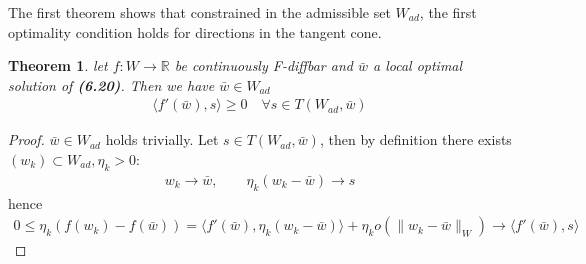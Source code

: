\documentclass[a4paper,11pt,fleqn]{book}
\newtheorem{theorem}{Theorem}[section]
\theoremstyle{definition}
\theoremstyle{remark}
\begin{document}
The first theorem shows that constrained in the admissible set $W_{ad}$, the first optimality condition holds for directions in the tangent cone.  
\begin{theorem}
	let $f: W \rightarrow \mathbb{R}$ be continuously F-diffbar and $\bar{w}$ a local optimal solution of \textbf{(6.20)}. Then we have $\bar{w} \in W_{ad}$ 
	\begin{align*}
		\langle f'(\bar{w}), s \rangle \ge 0 \quad \forall s \in T(W_{ad}, \bar{w})
	\end{align*}
\end{theorem}
\begin{proof}
	$\bar{w} \in W_{ad}$ holds trivially. Let $s \in T(W_{ad}, \bar{w})$, then by definition there exists $(w_k) \subset W_{ad}, \eta_k > 0$:
	\begin{align*}
		w_k \rightarrow \bar{w},\qquad \eta_k(w_k - \bar{w}) \rightarrow s
	\end{align*}
	hence
	\begin{align*}
		0 \le \eta_k (f(w_k) - f(\bar{w}))
		= \langle f'(\bar{w}), \eta_k(w_k - \bar{w}) \rangle+ \eta_k o(\|w_k - \bar{w}\|_W)
		\rightarrow \langle f'(\bar{w}), s \rangle 
	\end{align*}
\end{proof}
\end{document}
